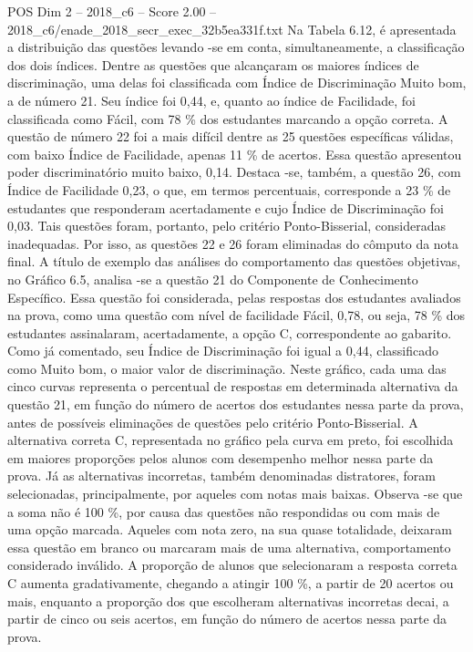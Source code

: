 \begin{textsample}{POS Dim 2 – 2018\_c6 – Score 2.00 – 2018\_c6/enade\_2018\_secr\_exec\_32b5ea331f.txt}
Na Tabela 6.12, é apresentada a distribuição das questões levando -se em conta, simultaneamente, a classificação dos dois índices.
Dentre as questões que alcançaram os maiores índices de discriminação, uma delas foi classificada com Índice de Discriminação Muito bom, a de número 21.
Seu índice foi 0,44, e, quanto ao índice de Facilidade, foi classificada como Fácil, com 78 \% dos estudantes marcando a opção correta.
A questão de número 22 foi a mais difícil dentre as 25 questões específicas válidas, com baixo Índice de Facilidade, apenas 11 \% de acertos.
Essa questão apresentou poder discriminatório muito baixo, 0,14.
Destaca -se, também, a questão 26, com Índice de Facilidade 0,23, o que, em termos percentuais, corresponde a 23 \% de estudantes que responderam acertadamente e cujo Índice de Discriminação foi 0,03.
Tais questões foram, portanto, pelo critério Ponto-Bisserial, consideradas inadequadas.
Por isso, as questões 22 e 26 foram eliminadas do cômputo da nota final.
A título de exemplo das análises do comportamento das questões objetivas, no Gráfico 6.5, analisa -se a questão 21 do Componente de Conhecimento Específico.
Essa questão foi considerada, pelas respostas dos estudantes avaliados na prova, como uma questão com nível de facilidade Fácil, 0,78, ou seja, 78 \% dos estudantes assinalaram, acertadamente, a opção C, correspondente ao gabarito.
Como já comentado, seu Índice de Discriminação foi igual a 0,44, classificado como Muito bom, o maior valor de discriminação.
Neste gráfico, cada uma das cinco curvas representa o percentual de respostas em determinada alternativa da questão 21, em função do número de acertos dos estudantes nessa parte da prova, antes de possíveis eliminações de questões pelo critério Ponto-Bisserial.
A alternativa correta C, representada no gráfico pela curva em preto, foi escolhida em maiores proporções pelos alunos com desempenho melhor nessa parte da prova.
Já as alternativas incorretas, também denominadas distratores, foram selecionadas, principalmente, por aqueles com notas mais baixas.
Observa -se que a soma não é 100 \%, por causa das questões não respondidas ou com mais de uma opção marcada.
Aqueles com nota zero, na sua quase totalidade, deixaram essa questão em branco ou marcaram mais de uma alternativa, comportamento considerado inválido.
A proporção de alunos que selecionaram a resposta correta C aumenta gradativamente, chegando a atingir 100 \%, a partir de 20 acertos ou mais, enquanto a proporção dos que escolheram alternativas incorretas decai, a partir de cinco ou seis acertos, em função do número de acertos nessa parte da prova.

\end{textsample}
